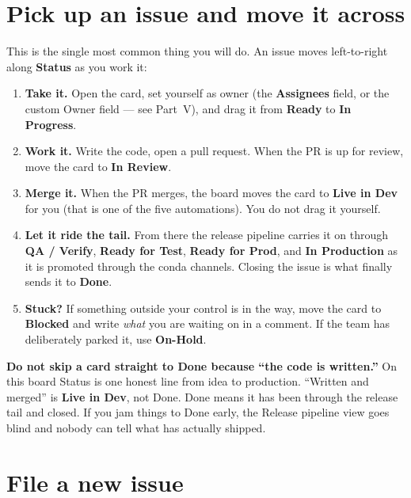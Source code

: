 \documentclass[11pt,a4paper]{report}
\newcommand{\fieldname}[1]{\textbf{#1}}
\begin{document}
\section{Pick up an issue and move it across}

This is the single most common thing you will do. An issue moves left-to-right along
\fieldname{Status} as you work it:

\begin{enumerate}[leftmargin=1.7em,itemsep=4pt]
  \item \textbf{Take it.} Open the card, set yourself as owner (the
        \fieldname{Assignees} field, or the custom Owner field --- see Part~V), and
        drag it from \textbf{Ready} to \textbf{In Progress}.
  \item \textbf{Work it.} Write the code, open a pull request. When the PR is up for
        review, move the card to \textbf{In Review}.
  \item \textbf{Merge it.} When the PR merges, the board moves the card to
        \textbf{Live in Dev} for you (that is one of the five automations). You do
        not drag it yourself.
  \item \textbf{Let it ride the tail.} From there the release pipeline carries it on
        through \textbf{QA / Verify}, \textbf{Ready for Test}, \textbf{Ready for
        Prod}, and \textbf{In Production} as it is promoted through the conda
        channels. Closing the issue is what finally sends it to \textbf{Done}.
  \item \textbf{Stuck?} If something outside your control is in the way, move the
        card to \textbf{Blocked} and write \emph{what} you are waiting on in a
        comment. If the team has deliberately parked it, use \textbf{On-Hold}.
\end{enumerate}

\begin{gotcha}
\textbf{Do not skip a card straight to Done because ``the code is written.''} On this
board Status is one honest line from idea to production. ``Written and merged'' is
\textbf{Live in Dev}, not Done. Done means it has been through the release tail and
closed. If you jam things to Done early, the Release pipeline view goes blind and
nobody can tell what has actually shipped.
\end{gotcha}

\section{File a new issue}
\end{document}
